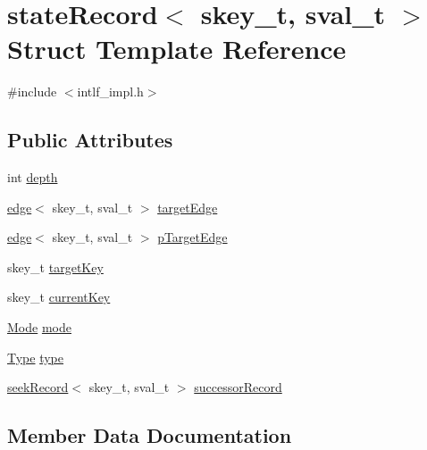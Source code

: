 \hypertarget{structstateRecord}{}\section{state\+Record$<$ skey\+\_\+t, sval\+\_\+t $>$ Struct Template Reference}
\label{structstateRecord}


{\ttfamily \#include $<$intlf\+\_\+impl.\+h$>$}

\subsection*{Public Attributes}
\begin{DoxyCompactItemize}
\item 
int \hyperlink{structstateRecord_ac725427eab6460435554ac5a2f9d880d}{depth}
\item 
\hyperlink{structedge}{edge}$<$ skey\+\_\+t, sval\+\_\+t $>$ \hyperlink{structstateRecord_ad0f7bb1f0798b986c6d924be5fab7077}{target\+Edge}
\item 
\hyperlink{structedge}{edge}$<$ skey\+\_\+t, sval\+\_\+t $>$ \hyperlink{structstateRecord_ae2b05b20fc0184e8cf84005f1da73a6c}{p\+Target\+Edge}
\item 
skey\+\_\+t \hyperlink{structstateRecord_acaced3e9c482c829b679cfd8cb9ff07f}{target\+Key}
\item 
skey\+\_\+t \hyperlink{structstateRecord_a4db56e4d8f1cc30d0087721d7b4cc39f}{current\+Key}
\item 
\hyperlink{intlf__impl_8h_a46c8a310cf4c094f8c80e1cb8dc1f911}{Mode} \hyperlink{structstateRecord_a1903fb379d70b6a7743cb5d329c17e44}{mode}
\item 
\hyperlink{intlf__impl_8h_a1d1cfd8ffb84e947f82999c682b666a7}{Type} \hyperlink{structstateRecord_a4ec229c5b99079c2103da81220452739}{type}
\item 
\hyperlink{structseekRecord}{seek\+Record}$<$ skey\+\_\+t, sval\+\_\+t $>$ \hyperlink{structstateRecord_ae385a9aaf16313a210dccd7ce94d0e0a}{successor\+Record}
\end{DoxyCompactItemize}


\subsection{Member Data Documentation}
\mbox{\label{structstateRecord_a4db56e4d8f1cc30d0087721d7b4cc39f}} 
